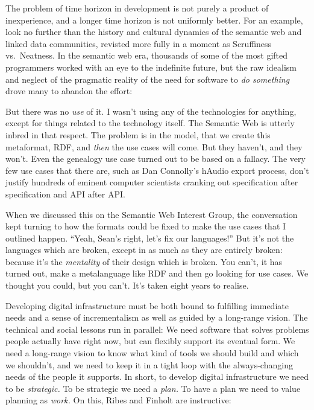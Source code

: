 \documentclass[10pt]{article}
\begin{document}
\begin{multicols}{2}
The problem of time horizon in development is not purely a product of
inexperience, and a longer time horizon is not uniformly better. For an
example, look no further than the history and cultural dynamics of the
semantic web and linked data communities, revisted more fully in a
moment as Scruffiness vs.~Neatness. In the semantic web era, thousands
of some of the most gifted programmers worked with an eye to the
indefinite future, but the raw idealism and neglect of the pragmatic
reality of the need for software to \emph{do something} drove many to
abandon the effort:

\begin{leftbar}
But there was no \emph{use} of it. I wasn't using any of the
technologies for anything, except for things related to the technology
itself. The Semantic Web is utterly inbred in that respect. The problem
is in the model, that we create this metaformat, RDF, and \emph{then}
the use cases will come. But they haven't, and they won't. Even the
genealogy use case turned out to be based on a fallacy. The very few use
cases that there are, such as Dan Connolly's hAudio export process,
don't justify hundreds of eminent computer scientists cranking out
specification after specification and API after API.

When we discussed this on the Semantic Web Interest Group, the
conversation kept turning to how the formats could be fixed to make the
use cases that I outlined happen. ``Yeah, Sean's right, let's fix our
languages!'' But it's not the languages which are broken, except in as
much as they are entirely broken: because it's the \emph{mentality} of
their design which is broken. You can't, it has turned out, make a
metalanguage like RDF and then go looking for use cases. We thought you
could, but you can't. It's taken eight years to realise. \cite{palmerDitchingSemanticWeb2008} 
\end{leftbar}

Developing digital infrastructure must be both bound to fulfilling
immediate needs and a sense of incrementalism as well as guided by a
long-range vision. The technical and social lessons run in parallel: We
need software that solves problems people actually have right now, but
can flexibly support its eventual form. We need a long-range vision to
know what kind of tools we should build and which we shouldn't, and we
need to keep it in a tight loop with the always-changing needs of the
people it supports. In short, to develop digital infrastructure we need
to be \emph{strategic.} To be strategic we need a \emph{plan.} To have a
plan we need to value planning as \emph{work.} On this, Ribes and
Finholt are instructive:


\end{multicols}
\end{document}
